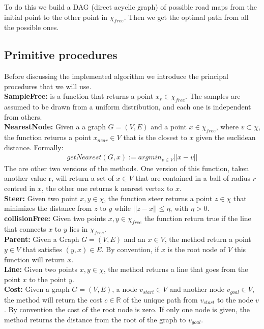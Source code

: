 \documentclass[10pt]{article}
\begin{document}
	To do this we build a DAG (direct acyclic graph) of possible road maps from the initial point to the other point in $\chi_{free}$. Then we get the optimal path from all the possible ones.
	
	\subsection{Primitive procedures}
	Before discussing the implemented algorithm we introduce the principal procedures that we will use.\\
	
	\textbf{SampleFree:} is a function that returns a point $x_{r} \in \chi_{free}$. The samples are assumed to be drawn from a uniform distribution, and each one is independent from others.\\
	
	
	\textbf{NearestNode:} Given a a graph $G=(V,E)$ and a point $x\in\chi_{free}$, where $v\subset\chi$, the function returns a point $x_{near} \in V$ that is the closest to $x$ given the euclidean distance. Formally: 
	\begin{align}
    getNearest (G,x) := argmin_{v \in V} ||x - v|| \nonumber
	\end{align}
	The are other two versions of the methods. One version of this function, taken another value r, will return a set of $x\in V$ that are contained in a ball of radius $r$ centred in $x$, the other one returns k nearest vertex to $x$.\\  
	
	\textbf{Steer:} Given two point $x,y \in \chi$, the function steer returns a point $z \in \chi$ that minimizes	 the distance from $z$ to $y$ while $||z-x|| \le \eta$, with $\eta > 0$. \\
	
	\textbf{collisionFree:} Given two points $x,y \in \chi_{free}$ the function return true if the line that connects $x$ to $y$ lies in $\chi_{free}$.\\
	
	\textbf{Parent:} Given a Graph $G=(V,E)$ and an $x\in V$, the method return a point $y \in V$ that satisfies $(y,x) \in E$. By convention, if $x$ is the root node of $V$ this function will return $x$.\\
	
	\textbf{Line:} Given two points $x,y \in \chi$, the method returns a line that goes from the point $x$ to the point $y$.\\
	
	\textbf{Cost:} Given a graph $G=(V,E)$, a node $v_{start} \in V$ and another node $v_{goal} \in V$, the method will return the cost $c \in\mathbb{R}$ of the unique path from $v_{start}$ to the node $v$. By convention the cost of the root node is zero. If only one node is given, the method returns the distance from the root of the graph to $v_{goal}$.\\
\end{document}
